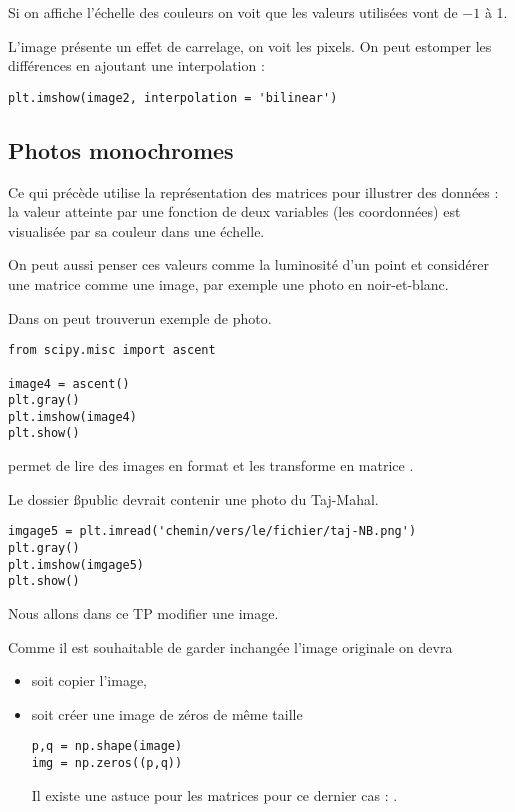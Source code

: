 Si on affiche l'échelle des couleurs on voit que les valeurs utilisées vont de $-1$ à 1.

L'image présente un effet de carrelage, on voit les pixels. On peut estomper les différences en ajoutant une interpolation :
\begin{lstlisting}
plt.imshow(image2, interpolation = 'bilinear')
\end{lstlisting}
\subsection{Photos monochromes}
Ce qui précède utilise la représentation des matrices pour illustrer des données : la valeur atteinte par une fonction de deux variables (les coordonnées) est visualisée par sa couleur dans une échelle.

On peut aussi penser ces valeurs comme la luminosité d'un point et considérer une matrice comme une image, par exemple une photo en noir-et-blanc.

Dans  on peut trouverun exemple de photo. 

\begin{lstlisting}
from scipy.misc import ascent

image4 = ascent()
plt.gray()
plt.imshow(image4)
plt.show()
\end{lstlisting}

 permet de lire des images en format  et les transforme en matrice .

Le dossier {\ss public} devrait contenir une photo du Taj-Mahal.

\begin{lstlisting}
imgage5 = plt.imread('chemin/vers/le/fichier/taj-NB.png')
plt.gray()
plt.imshow(imgage5)
plt.show()
\end{lstlisting}


Nous allons dans ce TP modifier une image.

Comme il est souhaitable de garder inchangée l'image originale on devra

\begin{itemize}
\item soit copier l'image, 
\item soit créer une image de zéros de même taille
\begin{lstlisting}
p,q = np.shape(image)
img = np.zeros((p,q))
\end{lstlisting}
Il existe une astuce pour les matrices  pour ce dernier cas : .
\end{itemize}
